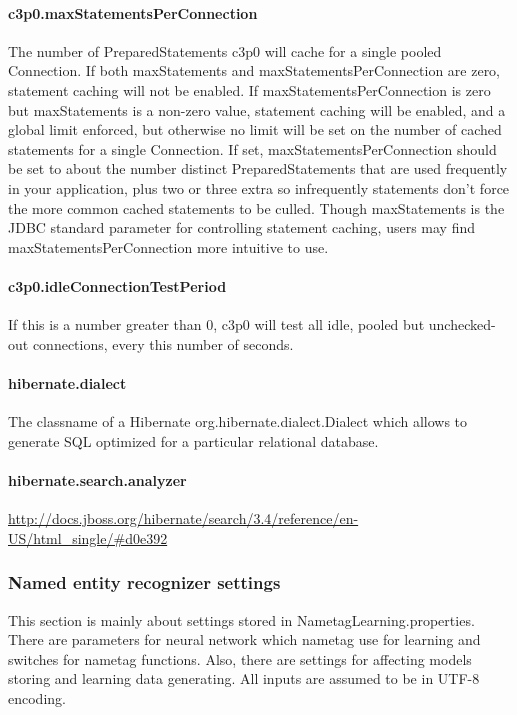 \paragraph{c3p0.maxStatementsPerConnection}
The number of PreparedStatements c3p0 will cache for a single pooled Connection.
If both maxStatements and maxStatementsPerConnection are zero, statement caching
will not be enabled. If maxStatementsPerConnection is zero but maxStatements is
a non-zero value, statement caching will be enabled, and a global limit enforced,
but otherwise no limit will be set on the number of cached statements for a single
Connection. If set, maxStatementsPerConnection should be set to about the number
distinct PreparedStatements that are used frequently in your application, plus
two or three extra so infrequently statements don't force the more common cached
statements to be culled. Though maxStatements is the JDBC standard parameter for
controlling statement caching, users may find maxStatementsPerConnection more
intuitive to use.

\paragraph{c3p0.idleConnectionTestPeriod}
If this is a number greater than 0, c3p0 will test all idle, pooled but unchecked-out
connections, every this number of seconds.

\paragraph{hibernate.dialect}
The classname of a Hibernate org.hibernate.dialect.Dialect which allows to generate
SQL optimized for a particular relational database.

\paragraph{hibernate.search.analyzer}
\url{http://docs.jboss.org/hibernate/search/3.4/reference/en-US/html_single/#d0e392}

\subsubsection{Named entity recognizer settings}
\label{sssec:NametagSettings}
This section is mainly about settings stored in NametagLearning.properties. There
are parameters for neural network which nametag use for learning and switches for
nametag functions. Also, there are settings for affecting models storing and
learning data generating. All inputs are assumed to be in UTF-8 encoding.

